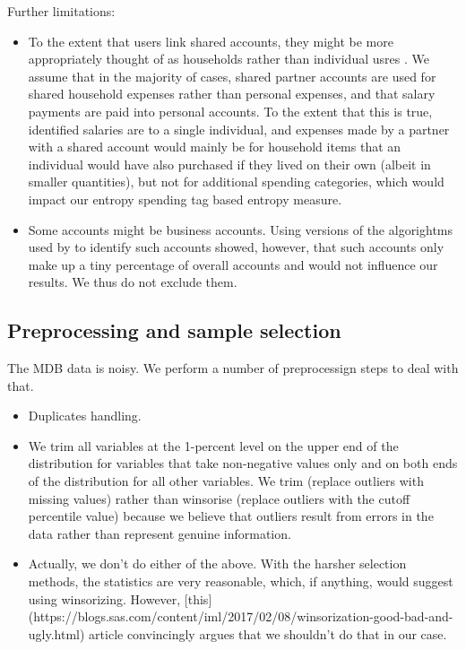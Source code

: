 Further limitations:
\begin{itemize}
    \item To the extent that users link shared accounts, they might be more
        appropriately thought of as households rather than individual usres
    \citep{bourquin2020effects}. We assume that in the majority of cases,
    shared partner accounts are used for shared household expenses rather than
    personal expenses, and that salary payments are paid into personal
    accounts. To the extent that this is true, identified salaries are to a
    single individual, and expenses made by a partner with a shared account
    would mainly be for household items that an individual would have also
    purchased if they lived on their own (albeit in smaller quantities), but
    not for additional spending categories, which would impact our entropy
    spending tag based entropy measure.

    \item Some accounts might be business accounts. Using versions of the
        algorightms used by \citet{bourquin2020effects} to identify such
        accounts showed, however, that such accounts only make up a tiny
        percentage of overall accounts and would not influence our results. We
        thus do not exclude them.
\end{itemize}



\subsection{Preprocessing and sample selection}%
\label{sub:preprocessing_and_sample_selection}

The MDB data is noisy. We perform a number of preprocessign steps to deal with
that.

\begin{itemize}
    \item Duplicates handling.
    \item We trim all variables at the 1-percent level on the upper end of the
        distribution for variables that take non-negative values only and on
        both ends of the distribution for all other variables. We trim
        (replace outliers with missing values) rather than winsorise (replace
        outliers with the cutoff percentile value) because we believe that
        outliers result from errors in the data rather than represent genuine
        information.
    \item Actually, we don't do either of the above. With the harsher selection
        methods, the statistics are very reasonable, which, if anything, would
        suggest using winsorizing. However,
        [this](https://blogs.sas.com/content/iml/2017/02/08/winsorization-good-bad-and-ugly.html)
        article convincingly argues that we shouldn't do that in our case.
\end{itemize}


